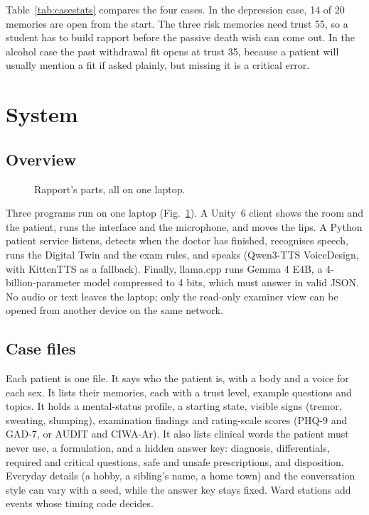 \documentclass{article}
\begin{document}
Table~\ref{tab:casestats} compares the four cases. In the depression case, 14 of 20 memories are open from the start. The three risk memories need trust 55, so a student has to build rapport before the passive death wish can come out. In the alcohol case the past withdrawal fit opens
at trust 35, because a patient will usually mention a fit if asked plainly, but missing it is a critical error.

\section{System}
\subsection{Overview}

\begin{figure}[t]
\caption{Rapport's parts, all on one laptop.}
\label{fig:overview}
\end{figure}

Three programs run on one laptop (Fig.~\ref{fig:overview}). A Unity~6 client shows the room and the patient, runs the interface and the microphone, and moves the lips. A Python patient service listens, detects when the doctor has finished, recognises speech, runs the Digital Twin and the exam rules, and speaks (Qwen3-TTS VoiceDesign, with KittenTTS as a fallback). Finally, llama.cpp \cite{llamacpp} runs Gemma 4 E4B, a 4-billion-parameter model compressed to 4 bits, which must answer in valid JSON. No audio or
text leaves the laptop; only the read-only examiner view can be opened from another device on the same network.

\subsection{Case files}
Each patient is one file. It says who the patient is, with a body and a voice for each sex. It lists their memories, each with a trust level, example questions and topics. It holds a mental-status profile, a starting state, visible signs (tremor, sweating, slumping), examination findings and rating-scale scores (PHQ-9 and GAD-7, or AUDIT and CIWA-Ar). It also lists clinical words the patient must never use, a formulation, and a hidden answer key: diagnosis, differentials, required and critical questions, safe and unsafe prescriptions, and disposition. Everyday details (a hobby, a sibling's name, a home town) and the conversation style can
vary with a seed, while the answer key stays fixed. Ward stations add events whose timing code decides.
\end{document}
